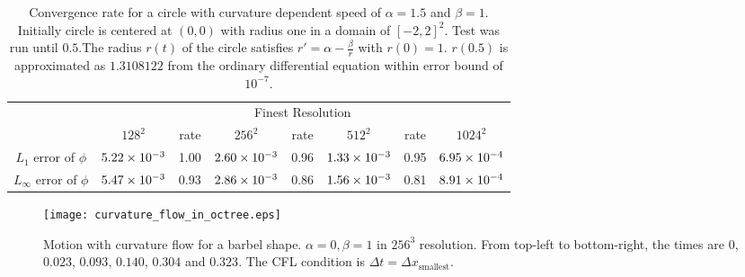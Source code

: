 \documentclass[english]{article}
\begin{document}
\begin{table}
\begin{center}
\begin{tabular}{|c|c|c|c|c|c|c|c|}\hline
\multirow{2}{*}{} & \multicolumn{7}{|c|}{Finest Resolution}\\\cline{2-8}
                  & $128^2$ & rate & $256^2$ &rate & $512^2$ & rate &$1024^2$ \\\hline
$L_1$      error of $\phi$&$5.22\times 10^{-3}$&1.00&$2.60\times 10^{-3}$&0.96&$1.33\times 10^{-3}$&0.95&$6.95\times 10^{-4}$\\\hline
$L_\infty$ error of $\phi$&$5.47\times 10^{-3}$&0.93&$2.86\times 10^{-3}$&0.86&$1.56\times 10^{-3}$&0.81&$8.91\times 10^{-4}$\\\hline
\end{tabular}
\end{center}
\caption{Convergence rate for a circle with curvature dependent speed of
$\alpha=1.5$ and $\beta=1$. Initially circle is centered at $(0,0)$ with
radius one in a domain of $[-2,2]^2$. Test was run until $0.5$.The radius
$r(t)$ of the circle satisfies $r'=\alpha-\frac\beta{r}$ with $r(0)=1$.
$r(0.5)$ is approximated as $1.3108122$ from the ordinary differential
equation within error bound of $10^{-7}$.}
\label{tab_circle_motion_by_curvature}
\end{table}


\begin{figure}
\begin{center}
\texttt{[image: curvature\_flow\_in\_octree.eps]}
\end{center}
\caption{Motion with curvature flow for a barbel shape. $\alpha=0,\beta=1$ in $256^3$ resolution. From top-left to bottom-right, the times are $0$, $0.023$, $0.093$, $0.140$, $0.304$ and $0.323$. The CFL condition is $\Delta t=\Delta x_{\text{smallest}}$.}
\label{fig_curvature_flow_in_octree}
\end{figure}
\end{document}

